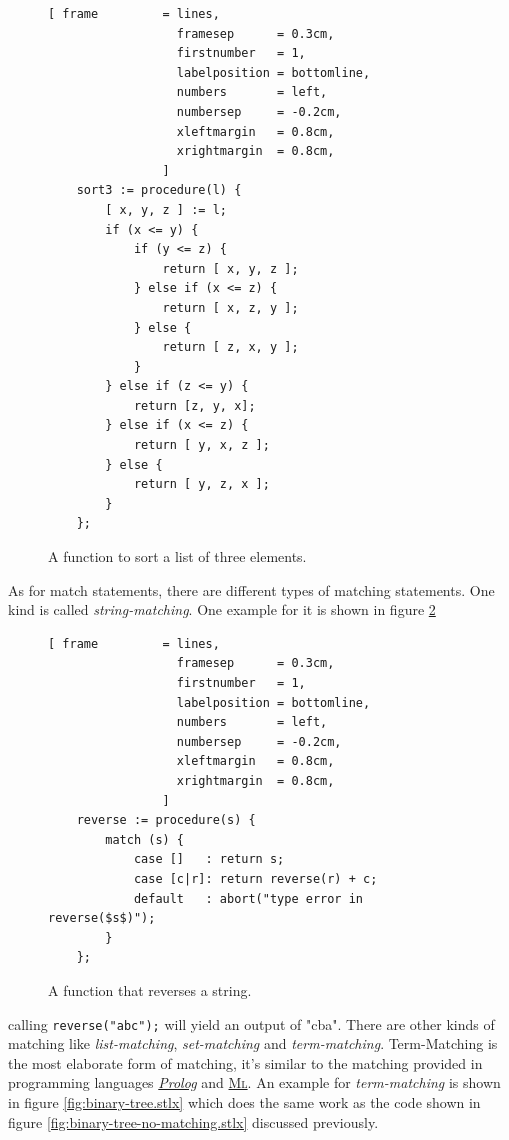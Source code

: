 \documentclass[11pt]{article}
\begin{document}
\begin{figure}[!ht]
\centering
\begin{Verbatim}[ frame         = lines, 
                  framesep      = 0.3cm, 
                  firstnumber   = 1,
                  labelposition = bottomline,
                  numbers       = left,
                  numbersep     = -0.2cm,
                  xleftmargin   = 0.8cm,
                  xrightmargin  = 0.8cm,
                ]
    sort3 := procedure(l) {
        [ x, y, z ] := l;
        if (x <= y) {
            if (y <= z) {
                return [ x, y, z ];
            } else if (x <= z) { 
                return [ x, z, y ];
            } else {
                return [ z, x, y ];
            }
        } else if (z <= y) { 
            return [z, y, x];
        } else if (x <= z) { 
            return [ y, x, z ];
        } else {
            return [ y, z, x ];
        }
    };
\end{Verbatim}
\vspace*{-0.3cm}
\caption{A function to sort a list of three elements.}
\label{fig:sort3.stlx}
\end{figure}

As for match statements, there are different types of matching statements. One kind is called \textsl{string-matching}. One example for it is shown in figure \ref{fig:reverse.stlx}

\begin{figure}[!ht]
\centering
\begin{Verbatim}[ frame         = lines, 
                  framesep      = 0.3cm, 
                  firstnumber   = 1,
                  labelposition = bottomline,
                  numbers       = left,
                  numbersep     = -0.2cm,
                  xleftmargin   = 0.8cm,
                  xrightmargin  = 0.8cm,
                ]
    reverse := procedure(s) {
        match (s) {
            case []   : return s;
            case [c|r]: return reverse(r) + c;
            default   : abort("type error in reverse($s$)");
        }
    };
\end{Verbatim}
\vspace*{-0.3cm}
\caption{A function that reverses a string.}
\label{fig:reverse.stlx}
\end{figure}
calling \texttt{reverse("abc");} will yield an output of "cba". There are other kinds of matching like \textsl{list-matching}, \textsl{set-matching} and \textsl{term-matching}. Term-Matching is the most elaborate form of matching, it's similar to the matching provided in programming languages \href{http://en.wikipedia.org/wiki/Prolog}{\textsl{Prolog}} and 
\href{http://en.wikipedia.org/wiki/ML_(programming_language)}{\textsc{Ml}}. An example for \textsl{term-matching} is shown in figure \ref{fig:binary-tree.stlx} which does the same work as the code shown in figure \ref{fig:binary-tree-no-matching.stlx} discussed previously.
\end{document}
